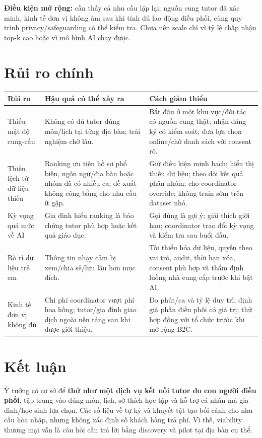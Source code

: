 \documentclass[11pt,a4paper]{article}
\begin{document}
\textbf{Điều kiện mở rộng:} cần thấy cả nhu cầu lặp lại, nguồn cung tutor đã
xác minh, kinh tế đơn vị không âm sau khi tính đủ lao động điều phối, cùng quy
trình privacy/safeguarding có thể kiểm tra. Chưa nên scale chỉ vì tỷ lệ chấp
nhận top-k cao hoặc vì mô hình AI chạy được.

\section{Rủi ro chính}

\begin{tabularx}{\textwidth}{p{3.1cm}Y Y}
\toprule
\textbf{Rủi ro} & \textbf{Hậu quả có thể xảy ra} & \textbf{Cách giảm thiểu} \\
\midrule
Thiếu mật độ cung-cầu &
Không có đủ tutor đúng môn/lịch tại từng địa bàn; trải nghiệm chờ lâu. &
Bắt đầu ở một khu vực/đối tác có nguồn cung thật; nhận đăng ký có kiểm soát;
đưa lựa chọn online/chờ danh sách với consent rõ. \\
Thiên lệch từ dữ liệu thiếu &
Ranking ưu tiên hồ sơ phổ biến, ngôn ngữ/địa bàn hoặc nhóm đã có nhiều ca;
đề xuất không công bằng cho nhu cầu ít gặp. &
Giữ điều kiện minh bạch; hiển thị thiếu dữ liệu; theo dõi kết quả phân nhóm;
cho coordinator override; không train sớm trên dataset nhỏ. \\
Kỳ vọng quá mức về AI &
Gia đình hiểu ranking là bảo chứng tutor phù hợp hoặc kết quả giáo dục. &
Gọi đúng là gợi ý; giải thích giới hạn; coordinator trao đổi kỳ vọng và kiểm
tra sau buổi đầu. \\
Rò rỉ dữ liệu trẻ em &
Thông tin nhạy cảm bị xem/chia sẻ/lưu lâu hơn mục đích. &
Tối thiểu hóa dữ liệu, quyền theo vai trò, audit, thời hạn xóa, consent phù
hợp và thẩm định luồng nhà cung cấp trước khi bật AI. \\
Kinh tế đơn vị không đủ &
Chi phí coordinator vượt phí hoa hồng; tutor/gia đình giao dịch ngoài nền
tảng sau khi được giới thiệu. &
Đo phút/ca và tỷ lệ duy trì; định giá phần điều phối có giá trị; thử hợp đồng
với tổ chức trước khi mở rộng B2C. \\
\bottomrule
\end{tabularx}

\section{Kết luận}

Ý tưởng có cơ sở để \textbf{thử như một dịch vụ kết nối tutor do con người điều
phối}, tập trung vào đúng môn, lịch, sở thích học tập và hỗ trợ cá nhân mà gia
đình/học sinh lựa chọn. Các số liệu về tự kỷ và khuyết tật tạo bối cảnh cho
nhu cầu hòa nhập, nhưng không xác định số khách hàng trả phí. Vì thế, viability
thương mại vẫn là câu hỏi cần trả lời bằng discovery và pilot tại địa bàn cụ
thể.
\end{document}
